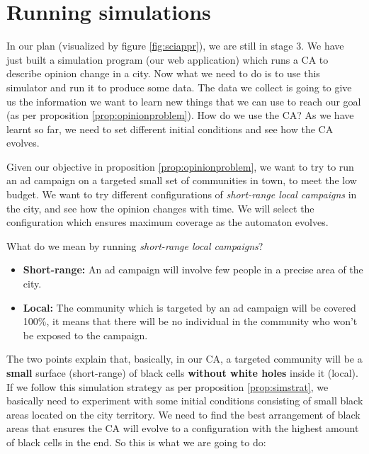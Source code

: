 \section{Running simulations}
In our plan (visualized by figure \ref{fig:sciappr}), we are still in stage 3. We have just built
a simulation program (our web application) which runs a CA to describe opinion change in a
city. Now what we need to do is to use this simulator and run it to produce some data. The data
we collect is going to give us the information we want to learn new things that we can use to reach
our goal (as per proposition \ref{prop:opinionproblem}). How do we use the CA? As we have learnt
so far, we need to set different initial conditions and see how the CA evolves.

\begin{proposition}
\label{prop:simstrat}
Given our objective in proposition \ref{prop:opinionproblem}, we want to try to run an ad
campaign on a targeted small set of communities in town, to meet the low budget. We want to try
different configurations of \textit{short-range local campaigns} in the city,
and see how the opinion changes with time. We will select the configuration which ensures
maximum coverage as the automaton evolves.
\end{proposition}

What do we mean by running \textit{short-range local campaigns}?

\begin{itemize}
\item \textbf{Short-range:} An ad campaign will involve few people in a precise area of the city.
\item \textbf{Local:} The community which is targeted by an ad campaign will be covered 100\%, it
means that there will be no individual in the community who won't be exposed to the campaign.
\end{itemize}

The two points explain that, basically, in our CA,
a targeted community will be a \textbf{small} surface (short-range) of black cells
\textbf{without white holes} inside it (local). If we follow this simulation strategy as per proposition
\ref{prop:simstrat}, we basically need to experiment with some initial conditions consisting of small
black areas located on the city territory. We need to find the best arrangement of black areas that
ensures the CA will evolve to a configuration with the highest amount of black cells in the end.
So this is what we are going to do:

